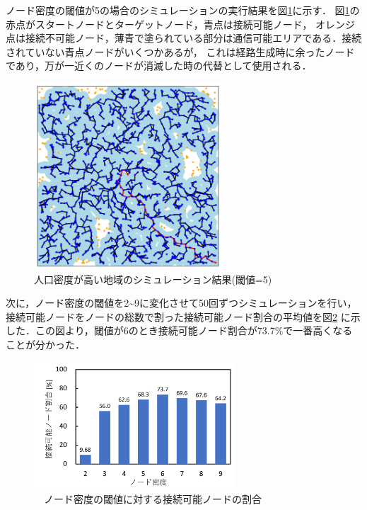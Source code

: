 \documentclass[a4paper, 9pt]{ltjsarticle}
\begin{document}
ノード密度の閾値が5の場合のシミュレーションの実行結果を図\ref{fig:1}に示す．
図\ref{fig:1}の赤点がスタートノードとターゲットノード，青点は接続可能ノード，
オレンジ点は接続不可能ノード，薄青で塗られている部分は通信可能エリアである．接続されていない青点ノードがいくつかあるが，
これは経路生成時に余ったノードであり，万が一近くのノードが消滅した時の代替として使用される．
\begin{figure}[ht]
  \centering
  \includegraphics[width=70mm]{シミュレーションの様子.png}
  \caption{人口密度が高い地域のシミュレーション結果(閾値=5)}
  \label{fig:1}
\end{figure}


次に，ノード密度の閾値を2\textasciitilde9に変化させて50回ずつシミュレーションを行い，接続可能ノードをノードの総数で割った接続可能ノード割合の平均値を図\ref{fig:2}
に示した．この図より，閾値が6のとき接続可能ノード割合が73.7\%で一番高くなることが分かった．
\begin{figure}[ht] %
  \centering
  \includegraphics[width=75mm]{提案1の結果.pdf}
  \caption{　ノード密度の閾値に対する接続可能ノードの割合}
  \label{fig:2} %
\end{figure}

\end{document}
